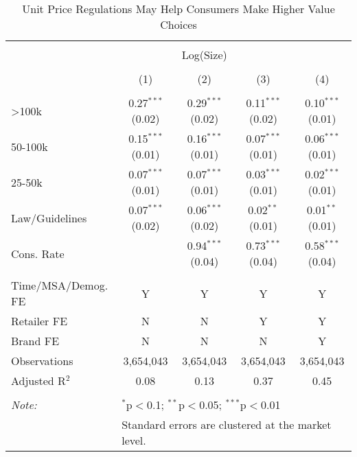 
\begin{table}[!htbp] \centering 
  \caption{Unit Price Regulations May Help Consumers Make Higher Value Choices} 
  \label{tab:unitPriceLawTp} 
\begin{tabular}{@{\extracolsep{5pt}}lcccc} 
\\[-1.8ex]\hline 
\hline \\[-1.8ex] 
 & \multicolumn{3}{c}{Log(Size)} &  \\ 
\\[-1.8ex] & (1) & (2) & (3) & (4)\\ 
\hline \\[-1.8ex] 
 >100k & 0.27$^{***}$ (0.02) & 0.29$^{***}$ (0.02) & 0.11$^{***}$ (0.02) & 0.10$^{***}$ (0.01) \\ 
  50-100k & 0.15$^{***}$ (0.01) & 0.16$^{***}$ (0.01) & 0.07$^{***}$ (0.01) & 0.06$^{***}$ (0.01) \\ 
  25-50k & 0.07$^{***}$ (0.01) & 0.07$^{***}$ (0.01) & 0.03$^{***}$ (0.01) & 0.02$^{***}$ (0.01) \\ 
  Law/Guidelines & 0.07$^{***}$ (0.02) & 0.06$^{***}$ (0.02) & 0.02$^{**}$ (0.01) & 0.01$^{**}$ (0.01) \\ 
  Cons. Rate &  & 0.94$^{***}$ (0.04) & 0.73$^{***}$ (0.04) & 0.58$^{***}$ (0.04) \\ 
 \hline \\[-1.8ex] 
Time/MSA/Demog. FE & Y & Y & Y & Y \\ 
Retailer FE & N & N & Y & Y \\ 
Brand FE & N & N & N & Y \\ 
Observations & 3,654,043 & 3,654,043 & 3,654,043 & 3,654,043 \\ 
Adjusted R$^{2}$ & 0.08 & 0.13 & 0.37 & 0.45 \\ 
\hline 
\hline \\[-1.8ex] 
\textit{Note:}  & \multicolumn{4}{l}{$^{*}$p$<$0.1; $^{**}$p$<$0.05; $^{***}$p$<$0.01} \\ 
 & \multicolumn{4}{l}{Standard errors are clustered at the market level.} \\ 
\end{tabular} 
\end{table} 
